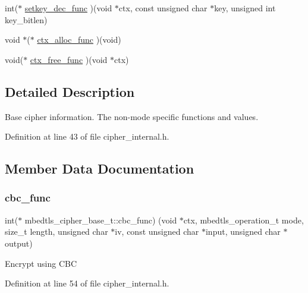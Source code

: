 \begin{DoxyCompactItemize}
\item 
int($\ast$ \mbox{\hyperlink{structmbedtls__cipher__base__t_a946b52cf0745a0d098781804a68d958c}{setkey\+\_\+dec\+\_\+func}} )(void $\ast$ctx, const unsigned char $\ast$key, unsigned int key\+\_\+bitlen)
\item 
void $\ast$($\ast$ \mbox{\hyperlink{structmbedtls__cipher__base__t_a95b0567a8a1644bc9325d08f74bbca99}{ctx\+\_\+alloc\+\_\+func}} )(void)
\item 
void($\ast$ \mbox{\hyperlink{structmbedtls__cipher__base__t_abbb84630477b19baf2831369e69965a8}{ctx\+\_\+free\+\_\+func}} )(void $\ast$ctx)
\end{DoxyCompactItemize}


\subsection{Detailed Description}
Base cipher information. The non-\/mode specific functions and values. 

Definition at line 43 of file cipher\+\_\+internal.\+h.



\subsection{Member Data Documentation}
\mbox{\label{structmbedtls__cipher__base__t_a205924b0ffe7b35d4b74a7a4c6675ddf}} 
\subsubsection{\texorpdfstring{cbc\+\_\+func}{cbc\_func}}
{\footnotesize\ttfamily int($\ast$ mbedtls\+\_\+cipher\+\_\+base\+\_\+t\+::cbc\+\_\+func) (void $\ast$ctx, mbedtls\+\_\+operation\+\_\+t mode, size\+\_\+t length, unsigned char $\ast$iv, const unsigned char $\ast$input, unsigned char $\ast$output)}

Encrypt using C\+BC 

Definition at line 54 of file cipher\+\_\+internal.\+h.

\mbox{\label{structmbedtls__cipher__base__t_a06361a67ea8a128d3a58b4f99ee6cf5f}} 
